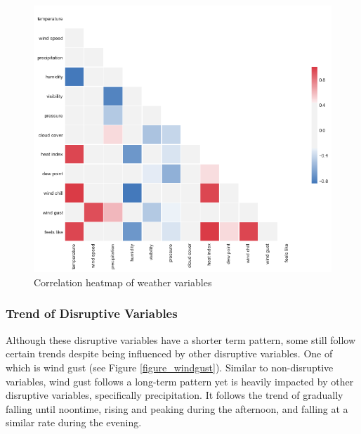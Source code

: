 \begin{figure}
  \includegraphics[width=\linewidth]{figures/figure_weather_corr.png}
  \caption{Correlation heatmap of weather variables}
  \label{figure_weather_corr}
\end{figure}








\subsubsection{Trend of Disruptive Variables}

Although these disruptive variables have a shorter term pattern, some still follow certain trends despite being influenced by other disruptive variables. One of which is wind gust (see Figure \ref{figure_windgust}). Similar to non-disruptive variables, wind gust follows a long-term pattern yet is heavily impacted by other disruptive variables, specifically precipitation. It follows the trend of gradually falling until noontime, rising and peaking during the afternoon, and falling at a similar rate during the evening.


